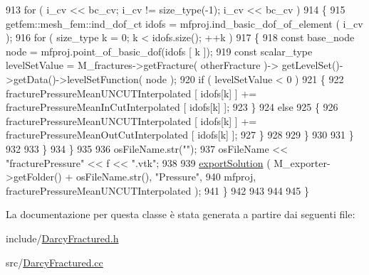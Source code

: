 \begin{DoxyCode}
913                 \textcolor{keywordflow}{for} ( i\_cv << bc\_cv; i\_cv != size\_type(-1); i\_cv << bc\_cv )
914                 \{
915                     getfem::mesh\_fem::ind\_dof\_ct idofs = mfproj.ind\_basic\_dof\_of\_element ( i\_cv );
916                     \textcolor{keywordflow}{for} ( size\_type k = 0; k < idofs.size(); ++k )
917                     \{
918                         \textcolor{keyword}{const} base\_node node = mfproj.point\_of\_basic\_dof(idofs [ k ]);
919                         \textcolor{keyword}{const} scalar\_type levelSetValue = M\_fractures->getFracture( otherFracture )->
      getLevelSet()->getData()->levelSetFunction( node );
920                         \textcolor{keywordflow}{if} ( levelSetValue < 0 )
921                         \{
922                             fracturePressureMeanUNCUTInterpolated [ idofs[k] ] += 
      fracturePressureMeanInCutInterpolated [ idofs[k] ];
923                         \}
924                         \textcolor{keywordflow}{else}
925                         \{
926                             fracturePressureMeanUNCUTInterpolated [ idofs[k] ] += 
      fracturePressureMeanOutCutInterpolated [ idofs[k] ];
927                         \}
928 
929                     \}
930 
931                 \}
932 
933             \}
934         \}
935 
936         osFileName.str(\textcolor{stringliteral}{""});
937         osFileName << \textcolor{stringliteral}{"fracturePressure"} << f << \textcolor{stringliteral}{".vtk"};
938 
939         \hyperlink{UsefulFunctions_8h_add7b8b88dc68d93addd88b9a4dc6e8bf}{exportSolution} ( M\_exporter->getFolder() + osFileName.str(), \textcolor{stringliteral}{"Pressure"},
940                      mfproj, fracturePressureMeanUNCUTInterpolated );
941     \}
942 
943    
944    
945 \}\end{DoxyCode}


La documentazione per questa classe è stata generata a partire dai seguenti file\-:\begin{DoxyCompactItemize}
\item 
include/\hyperlink{DarcyFractured_8h}{Darcy\-Fractured.\-h}\item 
src/\hyperlink{src_2DarcyFractured_8cc}{Darcy\-Fractured.\-cc}\end{DoxyCompactItemize}
